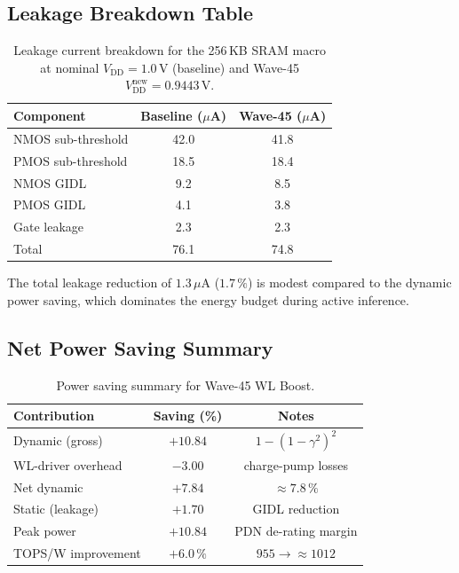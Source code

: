 \subsection{Leakage Breakdown Table}

\begin{table}[htbp]
  \centering
  \caption{Leakage current breakdown for the 256\,KB SRAM macro at
    nominal $V_{\mathrm{DD}} = 1.0\,\text{V}$ (baseline) and
    Wave-45 $V_{\mathrm{DD}}^{\mathrm{new}} = 0.9443\,\text{V}$.}
  \label{tab:leakage}
  \begin{tabular}{lcc}
    \hline
    \textbf{Component} & \textbf{Baseline ($\mu$A)} & \textbf{Wave-45 ($\mu$A)} \\
    \hline
    NMOS sub-threshold & 42.0  & 41.8 \\
    PMOS sub-threshold & 18.5  & 18.4 \\
    NMOS GIDL          &  9.2  &  8.5 \\
    PMOS GIDL          &  4.1  &  3.8 \\
    Gate leakage       &  2.3  &  2.3 \\
    \hline
    Total              & 76.1  & 74.8 \\
    \hline
  \end{tabular}
\end{table}

The total leakage reduction of $1.3\,\mu\text{A}$ ($1.7\,\%$) is
modest compared to the dynamic power saving, which dominates the
energy budget during active inference.

\subsection{Net Power Saving Summary}

\begin{table}[htbp]
  \centering
  \caption{Power saving summary for Wave-45 WL Boost.}
  \label{tab:power-summary}
  \begin{tabular}{lcc}
    \hline
    \textbf{Contribution} & \textbf{Saving (\%)} & \textbf{Notes} \\
    \hline
    Dynamic (gross)    & $+10.84$ & $1-(1-\gamma^2)^2$ \\
    WL-driver overhead & $-3.00$  & charge-pump losses \\
    Net dynamic        & $+7.84$  & $\approx 7.8\,\%$ \\
    Static (leakage)   & $+1.70$  & GIDL reduction \\
    Peak power         & $+10.84$ & PDN de-rating margin \\
    \hline
    TOPS/W improvement & $+6.0\,\%$ & $955 \to \approx 1012$ \\
    \hline
  \end{tabular}
\end{table}

